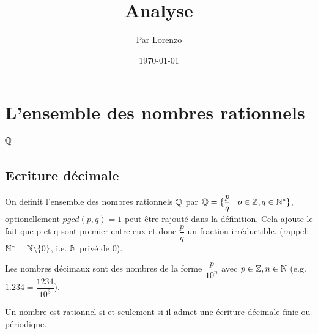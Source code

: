 \documentclass[a4paper, 12pt]{article}
\title{Analyse}
\author{Par Lorenzo}
\date{\today}
\begin{document}
\maketitle

\tableofcontents



\section{L'ensemble des nombres rationnels $\mathbb{Q}$}

\subsection{Ecriture décimale}

\begin{definition}
    On definit l'ensemble des nombres rationnels $\mathbb{Q}$ par \break
    $\mathbb{Q} = \{\dfrac{p}{q} \mid p \in \mathbb{Z}, q \in \mathbb{N}^*\}$,
    optionellement $pgcd(p, q) = 1$ peut être rajouté dans la définition.
    Cela ajoute le fait que p et q sont premier entre eux et donc $\dfrac{p}{q}$ un fraction irréductible.
    (rappel: $\mathbb{N}^*=\mathbb{N}\backslash\{0\}$, i.e. $\mathbb{N}$ privé de 0).
\end{definition}

\begin{remark}
    Les nombres décimaux sont des nombres de la forme \break $\dfrac{p}{10^n}$ avec $p \in \mathbb{Z}, n \in \mathbb{N}$
    (e.g. $1.234 = \dfrac{1234}{10^3}$).
\end{remark}

\begin{proposition}
    Un nombre est rationnel si et seulement si il admet une écriture décimale finie ou périodique.
\end{proposition}
\end{document}
